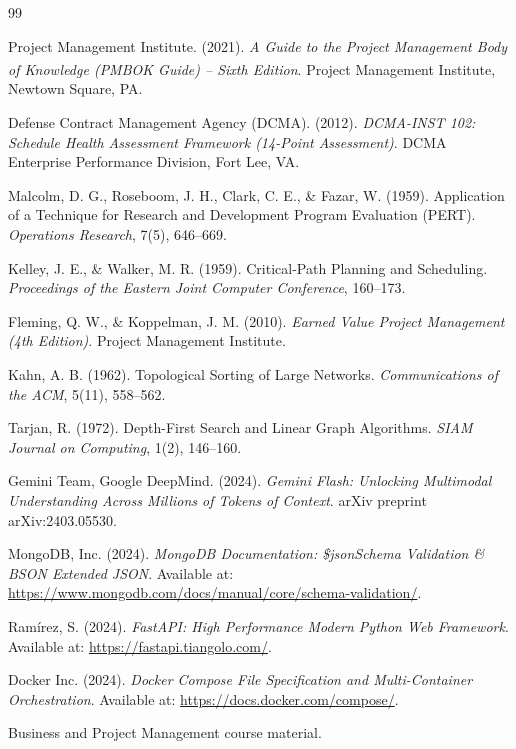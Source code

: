 \documentclass[11pt,a4paper]{report}
\begin{document}


\footnotesize
\tableofcontents
\normalsize

\newpage









\begin{thebibliography}{99}

Project Management Institute. (2021). \textit{A Guide to the Project Management Body of Knowledge (PMBOK\textsuperscript{\textregistered} Guide) -- Sixth Edition}. Project Management Institute, Newtown Square, PA.

Defense Contract Management Agency (DCMA). (2012). \textit{DCMA-INST 102: Schedule Health Assessment Framework (14-Point Assessment)}. DCMA Enterprise Performance Division, Fort Lee, VA.

Malcolm, D. G., Roseboom, J. H., Clark, C. E., \& Fazar, W. (1959). Application of a Technique for Research and Development Program Evaluation (PERT). \textit{Operations Research}, 7(5), 646--669.

Kelley, J. E., \& Walker, M. R. (1959). Critical-Path Planning and Scheduling. \textit{Proceedings of the Eastern Joint Computer Conference}, 160--173.

Fleming, Q. W., \& Koppelman, J. M. (2010). \textit{Earned Value Project Management (4th Edition)}. Project Management Institute.

Kahn, A. B. (1962). Topological Sorting of Large Networks. \textit{Communications of the ACM}, 5(11), 558--562.

Tarjan, R. (1972). Depth-First Search and Linear Graph Algorithms. \textit{SIAM Journal on Computing}, 1(2), 146--160.

Gemini Team, Google DeepMind. (2024). \textit{Gemini Flash: Unlocking Multimodal Understanding Across Millions of Tokens of Context}. arXiv preprint arXiv:2403.05530.

MongoDB, Inc. (2024). \textit{MongoDB Documentation: \$jsonSchema Validation \& BSON Extended JSON}. Available at: \url{https://www.mongodb.com/docs/manual/core/schema-validation/}.

Ramírez, S. (2024). \textit{FastAPI: High Performance Modern Python Web Framework}. Available at: \url{https://fastapi.tiangolo.com/}.

Docker Inc. (2024). \textit{Docker Compose File Specification and Multi-Container Orchestration}. Available at: \url{https://docs.docker.com/compose/}.

Business and Project Management course material. 
\end{thebibliography}
\end{document}
